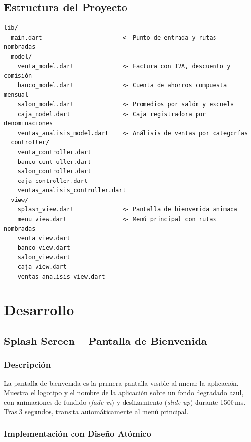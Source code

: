 \documentclass[12pt,a4paper]{article}
\begin{document}
\subsection{Estructura del Proyecto}

{\small
\begin{verbatim}
lib/
  main.dart                       <- Punto de entrada y rutas nombradas
  model/
    venta_model.dart              <- Factura con IVA, descuento y comisión
    banco_model.dart              <- Cuenta de ahorros compuesta mensual
    salon_model.dart              <- Promedios por salón y escuela
    caja_model.dart               <- Caja registradora por denominaciones
    ventas_analisis_model.dart    <- Análisis de ventas por categorías
  controller/
    venta_controller.dart
    banco_controller.dart
    salon_controller.dart
    caja_controller.dart
    ventas_analisis_controller.dart
  view/
    splash_view.dart              <- Pantalla de bienvenida animada
    menu_view.dart                <- Menú principal con rutas nombradas
    venta_view.dart
    banco_view.dart
    salon_view.dart
    caja_view.dart
    ventas_analisis_view.dart
\end{verbatim}
}

\section{Desarrollo}

\subsection{Splash Screen -- Pantalla de Bienvenida}

\subsubsection{Descripción}

La pantalla de bienvenida es la primera pantalla visible al iniciar la aplicación. Muestra el logotipo y el nombre de la aplicación sobre un fondo degradado azul, con animaciones de fundido (\textit{fade-in}) y deslizamiento (\textit{slide-up}) durante 1500\,ms. Tras 3 segundos, transita automáticamente al menú principal.

\subsubsection{Implementación con Diseño Atómico}
\end{document}
